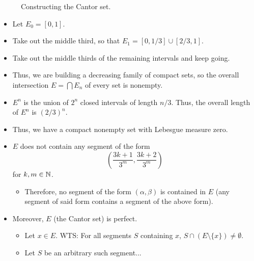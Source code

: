 \documentclass[../../notes.tex]{subfiles}
\begin{document}
\begin{itemize}
\begin{figure}[h!]
        \caption{Constructing the Cantor set.}
        \label{fig:cantorSet}
    \end{figure}
    \begin{itemize}
        \item Let $E_0=[0,1]$.
        \item Take out the middle third, so that $E_1=[0,1/3]\cup[2/3,1]$.
        \item Take out the middle thirds of the remaining intervals and keep going.
        \item Thus, we are building a decreasing family of compact sets, so the overall intersection $E=\bigcap E_n$ of every set is nonempty.
        \item $E^n$ is the union of $2^n$ closed intervals of length $n/3$. Thus, the overall length of $E^n$ is $(2/3)^n$.
        \item Thus, we have a compact nonempty set with Lebesgue measure zero.
        \item $E$ does not contain any segment of the form
        \begin{equation*}
            \left( \frac{3k+1}{3^m},\frac{3k+2}{3^m} \right)
        \end{equation*}
        for $k,m\in\mathbb{N}$.
        \begin{itemize}
            \item Therefore, no segment of the form $(\alpha,\beta)$ is contained in $E$ (any segment of said form contains a segment of the above form).
        \end{itemize}
        \item Moreover, $E$ (the Cantor set) is perfect.
        \begin{itemize}
            \item Let $x\in E$. WTS: For all segments $S$ containing $x$, $S\cap(E\setminus\{x\})\neq\emptyset$.
            \item Let $S$ be an arbitrary such segment...

\end{itemize}
\end{itemize}
\end{itemize}
\end{document}
